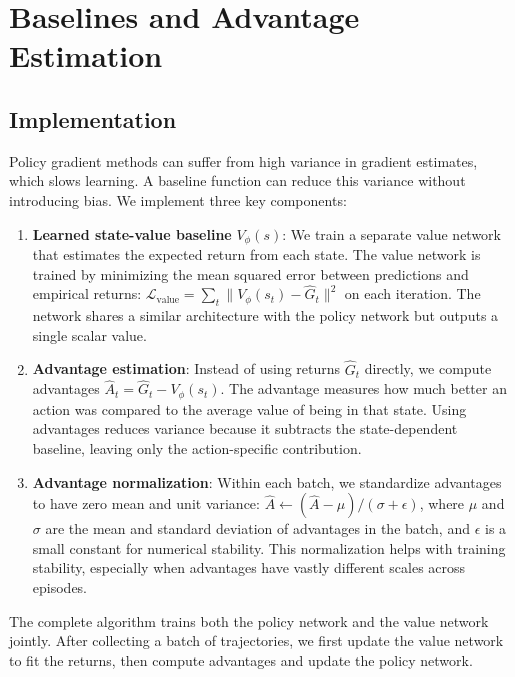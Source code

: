 \documentclass[11pt, a4paper, oneside]{memoir}
\begin{document}
\section{Baselines and Advantage Estimation}
\label{sec:baselines}

\subsection{Implementation}

Policy gradient methods can suffer from high variance in gradient estimates, which slows learning. A baseline function can reduce this variance without introducing bias. We implement three key components:

\begin{enumerate}
\item \textbf{Learned state-value baseline} $V_\phi(s)$: We train a separate value network that estimates the expected return from each state. The value network is trained by minimizing the mean squared error between predictions and empirical returns: $\mathcal{L}_{\text{value}} = \sum_t \|V_\phi(s_t) - \widehat{G}_t\|^2$ on each iteration. The network shares a similar architecture with the policy network but outputs a single scalar value.

\item \textbf{Advantage estimation}: Instead of using returns $\widehat{G}_t$ directly, we compute advantages $\widehat{A}_t = \widehat{G}_t - V_\phi(s_t)$. The advantage measures how much better an action was compared to the average value of being in that state. Using advantages reduces variance because it subtracts the state-dependent baseline, leaving only the action-specific contribution.

\item \textbf{Advantage normalization}: Within each batch, we standardize advantages to have zero mean and unit variance: $\widehat{A} \leftarrow (\widehat{A} - \mu) / (\sigma + \epsilon)$, where $\mu$ and $\sigma$ are the mean and standard deviation of advantages in the batch, and $\epsilon$ is a small constant for numerical stability. This normalization helps with training stability, especially when advantages have vastly different scales across episodes.
\end{enumerate}

The complete algorithm trains both the policy network and the value network jointly. After collecting a batch of trajectories, we first update the value network to fit the returns, then compute advantages and update the policy network.
\end{document}

